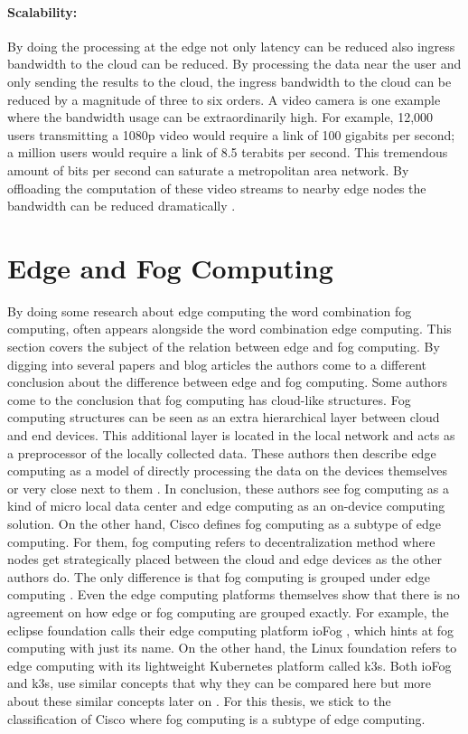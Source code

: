 \paragraph{Scalability:} By doing the processing at the edge not only latency can be reduced also ingress bandwidth to the cloud can be reduced. By processing the data near the user and only sending the results to the cloud, the ingress bandwidth to the cloud can be reduced by a magnitude of three to six orders. A video camera is one example where the bandwidth usage can be extraordinarily high. For example, 12,000 users transmitting a 1080p video would require a link of 100 gigabits per second; a million users would require a link of 8.5 terabits per second. This tremendous amount of bits per second can saturate a metropolitan area network. By offloading the computation of these video streams to nearby edge nodes the bandwidth can be reduced dramatically \cite{Shi2016a}.

\section{Edge and Fog Computing}
By doing some research about edge computing the word combination fog computing, often appears alongside the word combination edge computing. This section covers the subject of the relation between edge and fog computing. By digging into several papers and blog articles the authors come to a different conclusion about the difference between edge and fog computing. Some authors come to the conclusion that fog computing has cloud-like structures. Fog computing structures can be seen as an extra hierarchical layer between cloud and end devices. This additional layer is located in the local network and acts as a preprocessor of the locally collected data. These authors then describe edge computing as a model of directly processing the data on the devices themselves or very close next to them \cite{Ulmen2019}. In conclusion, these authors see fog computing as a kind of micro local data center and edge computing as an on-device computing solution. On the other hand, Cisco defines fog computing as a subtype of edge computing. For them, fog computing refers to decentralization method where nodes get strategically placed between the cloud and edge devices as the other authors do. The only difference is that fog computing is grouped under edge computing \cite{Cisco}. Even the edge computing platforms themselves show that there is no agreement on how edge or fog computing are grouped exactly. For example, the eclipse foundation calls their edge computing platform ioFog \cite{EclipseFoundation}, which hints at fog computing with just its name. On the other hand, the Linux foundation refers to edge computing with its lightweight Kubernetes platform called k3s. Both ioFog and k3s, use similar concepts that why they can be compared here but more about these similar concepts later on \cite{k3s}. For this thesis, we stick to the classification of Cisco where fog computing is a subtype of edge computing.

